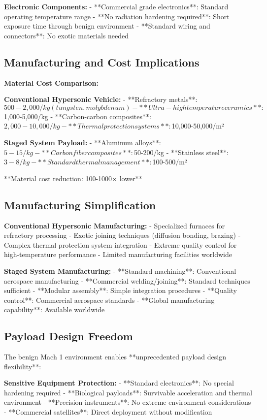 \documentclass[12pt,a4paper]{article}
\begin{document}
\textbf{Electronic Components:}
- **Commercial grade electronics**: Standard operating temperature range
- **No radiation hardening required**: Short exposure time through benign environment
- **Standard wiring and connectors**: No exotic materials needed

\subsection{Manufacturing and Cost Implications}

\textbf{Material Cost Comparison:}

\textbf{Conventional Hypersonic Vehicle:}
- **Refractory metals**: $500-2,000/kg (tungsten, molybdenum)
- **Ultra-high temperature ceramics**: $1,000-5,000/kg
- **Carbon-carbon composites**: $2,000-10,000/kg
- **Thermal protection systems**: $10,000-50,000/m²

\textbf{Staged System Payload:}
- **Aluminum alloys**: $5-15/kg
- **Carbon fiber composites**: $50-200/kg
- **Stainless steel**: $3-8/kg
- **Standard thermal management**: $100-500/m²

**Material cost reduction: 100-1000× lower**

\subsection{Manufacturing Simplification}

\textbf{Conventional Hypersonic Manufacturing:}
- Specialized furnaces for refractory processing
- Exotic joining techniques (diffusion bonding, brazing)
- Complex thermal protection system integration
- Extreme quality control for high-temperature performance
- Limited manufacturing facilities worldwide

\textbf{Staged System Manufacturing:}
- **Standard machining**: Conventional aerospace manufacturing
- **Commercial welding/joining**: Standard techniques sufficient
- **Modular assembly**: Simple integration procedures
- **Quality control**: Commercial aerospace standards
- **Global manufacturing capability**: Available worldwide

\subsection{Payload Design Freedom}

The benign Mach 1 environment enables **unprecedented payload design flexibility**:

\textbf{Sensitive Equipment Protection:}
- **Standard electronics**: No special hardening required
- **Biological payloads**: Survivable acceleration and thermal environment
- **Precision instruments**: No extreme environment considerations
- **Commercial satellites**: Direct deployment without modification
\end{document}
